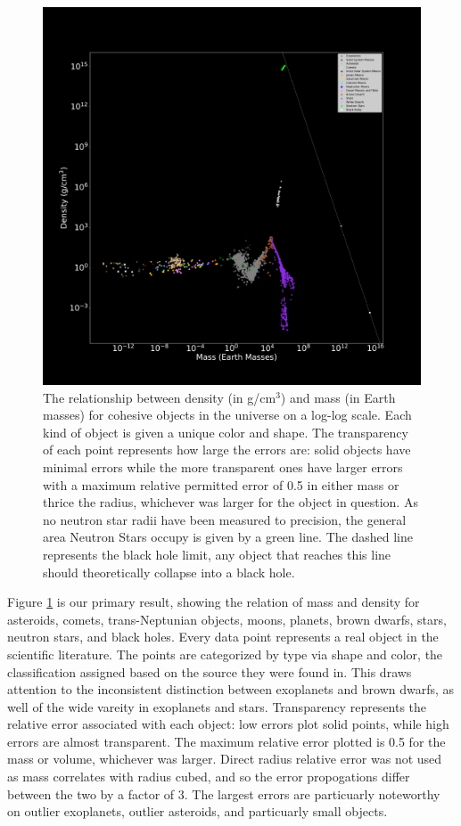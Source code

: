 \documentclass[twocolumn,linenumbers]{aastex631}
\begin{document}
\begin{figure}[htbp]
\centering
\includegraphics[scale = 0.35]{MassDensityPlot.pdf}
\centering
\caption{The relationship between density (in g/cm$^3$) and mass (in Earth masses) for cohesive objects in the universe on a log-log scale. Each kind of object is given a unique color and shape. The transparency of each point represents how large the errors are: solid objects have minimal errors while the more transparent ones have larger errors with a maximum relative permitted error of 0.5 in either mass or thrice the radius, whichever was larger for the object in question. As no  neutron star radii have been measured to precision, the general area Neutron Stars occupy is given by a green line. The dashed line represents the black hole limit, any object that reaches this line should theoretically collapse into a black hole. }
\label{fig:1}
\end{figure}

Figure \ref{fig:1} is our primary result, showing the relation of mass and density for asteroids, comets, trans-Neptunian objects, moons, planets, brown dwarfs, stars, neutron stars, and black holes. Every data point represents a real object in the scientific literature. The points are categorized by type via shape and color, the classification assigned based on the source they were found in. This draws attention to the inconsistent distinction between exoplanets and brown dwarfs, as well of the wide vareity in exoplanets and stars. Transparency represents the relative error associated with each object: low errors plot solid points, while high errors are almost transparent. The maximum relative error plotted is 0.5 for the mass or volume, whichever was larger. Direct radius relative error was not used as mass correlates with radius cubed, and so the error propogations differ between the two by a factor of 3. The largest errors are particuarly noteworthy on outlier exoplanets, outlier asteroids, and particuarly small objects. 
\end{document}
